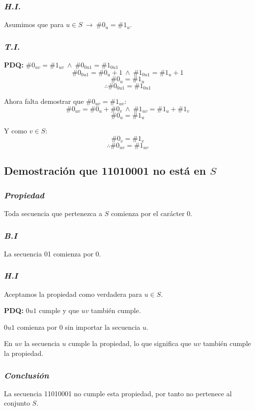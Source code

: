 \documentclass[../doc.tex]{subfiles}
\begin{document}
\subsubsection*{\emph{H.I.}}
Asumimos que para \(u \in S\ \rightarrow\ \#0_u = \#1_u\).

\subsubsection*{\emph{T.I.}}

\textbf{PDQ:} \(\#0_{uv} = \#1_{uv}\ \land\ \#0_{0u1} = \#1_{0u1}\)
\[\#0_{0u1} = \#0_u + 1\ \land\ \#1_{0u1} = \#1_u + 1\]
\[\#0_u = \#1_u\]
\[\therefore \#0_{0u1} = \#1_{0u1}\]

\noindent Ahora falta demostrar que \(\#0_{uv} = \#1_{uv}\):
\[\#0_{uv} = \#0_u + \#0_v\ \land\ \#1_{uv} = \#1_u + \#1_v\]
\[\#0_u = \#1_u\]

\noindent Y como \(v \in S\):
\[\#0_v = \#1_v\]
\[\therefore \#0_{uv} = \#1_{uv}\]

\subsection{Demostración que 11010001 no está en \(S\)}

\subsubsection*{\emph{Propiedad}}
Toda secuencia que pertenezca a \(S\) comienza por el carácter 0.

\subsubsection*{\emph{B.I}}
La secuencia 01 comienza por 0.

\subsubsection*{\emph{H.I}}
Aceptamos la propiedad como verdadera para \(u \in S\).

\textbf{PDQ:} \(0u1\) cumple y que \(uv\) también cumple.

\noindent \(0u1\) comienza por 0 sin importar la secuencia \(u\).

\noindent En \(uv\) la secuencia \(u\) cumple la propiedad, lo que significa que \(uv\) también cumple la propiedad.

\subsubsection*{\emph{Conclusión}}
La secuencia 11010001 no cumple esta propiedad, por tanto no pertenece al conjunto \(S\).
\end{document}
